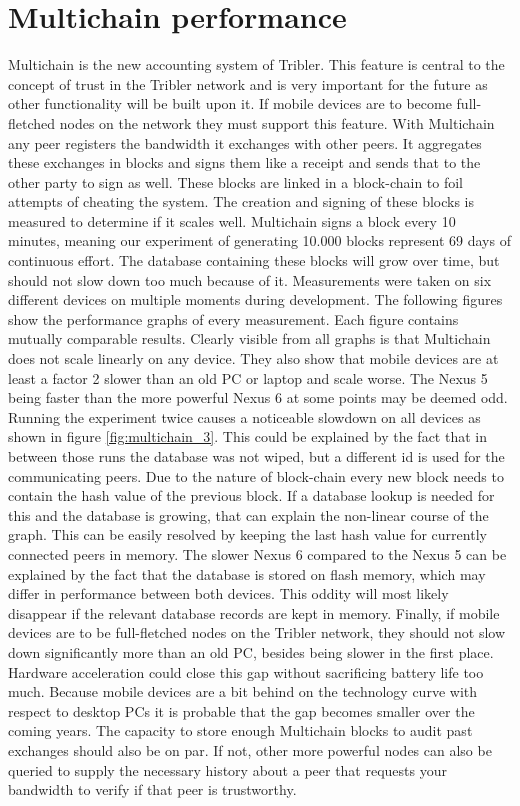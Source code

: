 \section{Multichain performance}
Multichain is the new accounting system of Tribler.
This feature is central to the concept of trust in the Tribler network and is very important for the future as other functionality will be built upon it.
If mobile devices are to become full-fletched nodes on the network they must support this feature.
With Multichain any peer registers the bandwidth it exchanges with other peers.
It aggregates these exchanges in blocks and signs them like a receipt and sends that to the other party to sign as well.
These blocks are linked in a block-chain to foil attempts of cheating the system.
The creation and signing of these blocks is measured to determine if it scales well.
Multichain signs a block every 10 minutes, meaning our experiment of generating 10.000 blocks represent 69 days of continuous effort.
The database containing these blocks will grow over time, but should not slow down too much because of it.
Measurements were taken on six different devices on multiple moments during development.
The following figures show the performance graphs of every measurement.
Each figure contains mutually comparable results.
Clearly visible from all graphs is that Multichain does not scale linearly on any device.
They also show that mobile devices are at least a factor 2 slower than an old PC or laptop and scale worse.
The Nexus 5 being faster than the more powerful Nexus 6 at some points may be deemed odd.
Running the experiment twice causes a noticeable slowdown on all devices as shown in figure \ref{fig:multichain_3}.
This could be explained by the fact that in between those runs the database was not wiped, but a different id is used for the communicating peers.
Due to the nature of block-chain every new block needs to contain the hash value of the previous block.
If a database lookup is needed for this and the database is growing, that can explain the non-linear course of the graph.
This can be easily resolved by keeping the last hash value for currently connected peers in memory.
The slower Nexus 6 compared to the Nexus 5 can be explained by the fact that the database is stored on flash memory, which may differ in performance between both devices.
This oddity will most likely disappear if the relevant database records are kept in memory.
Finally, if mobile devices are to be full-fletched nodes on the Tribler network, they should not slow down significantly more than an old PC, besides being slower in the first place.
Hardware acceleration could close this gap without sacrificing battery life too much.
Because mobile devices are a bit behind on the technology curve with respect to desktop PCs it is probable that the gap becomes smaller over the coming years.
The capacity to store enough Multichain blocks to audit past exchanges should also be on par.
If not, other more powerful nodes can also be queried to supply the necessary history about a peer that requests your bandwidth to verify if that peer is trustworthy.

